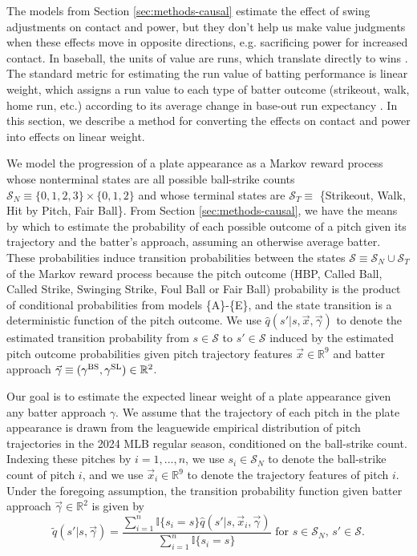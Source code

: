 \documentclass{article}
\begin{document}
      The models from Section \ref{sec:methods-causal} estimate the effect of swing adjustments on contact and power, but they don't help us make value judgments when these effects move in opposite directions, e.g. sacrificing power for increased contact. In baseball, the units of value are runs, which translate directly to wins \citep{james_bill_1983}. The standard metric for estimating the run value of batting performance is linear weight, which assigns a run value to each type of batter outcome (strikeout, walk, home run, etc.) according to its average change in base-out run expectancy \citep{thorn_hidden_1984}. In this section, we describe a method for converting the effects on contact and power into effects on linear weight.

      We model the progression of a plate appearance as a Markov reward process whose nonterminal states are all possible ball-strike counts $\mathcal{S}_N \equiv \{0, 1, 2, 3\} \times \{0, 1, 2\}$ and whose terminal states are $\mathcal{S}_T \equiv$ \{Strikeout, Walk, Hit by Pitch, Fair Ball\}. From Section \ref{sec:methods-causal}, we have the means by which to estimate the probability of each possible outcome of a pitch given its trajectory and the batter's approach, assuming an otherwise average batter. These probabilities induce transition probabilities between the states $\mathcal{S} \equiv \mathcal{S}_N \cup \mathcal{S}_T$ of the Markov reward process because the pitch outcome (HBP, Called Ball, Called Strike, Swinging Strike, Foul Ball or Fair Ball) probability is the product of conditional probabilities from models \{A\}-\{E\}, and the state transition is a deterministic function of the pitch outcome. We use $\hat q(s' | s, \vec x, \vec \gamma)$ to denote the estimated transition probability from $s \in \mathcal{S}$ to $s' \in \mathcal{S}$ induced by the estimated pitch outcome probabilities given pitch trajectory features $\vec x \in \mathbb{R}^9$ and batter approach $\vec\gamma \equiv (\gamma^{\mbox{\scriptsize BS}}, \gamma^{\mbox{\scriptsize SL}}) \in \mathbb{R}^2$.

      Our goal is to estimate the expected linear weight of a plate appearance given any batter approach $\gamma$. We assume that the trajectory of each pitch in the plate appearance is drawn from the leaguewide empirical distribution of pitch trajectories in the 2024 MLB regular season, conditioned on the ball-strike count. Indexing these pitches by $i = 1, ..., n$, we use $s_i \in \mathcal{S}_N$ to denote the ball-strike count of pitch $i$, and we use $\vec x_i \in \mathbb{R}^9$ to denote the trajectory features of pitch $i$. Under the foregoing assumption, the transition probability function given batter approach $\vec\gamma \in \mathbb{R}^2$ is given by
      \begin{equation*}
        \tilde q(s' | s, \vec\gamma) = \frac{
          \sum_{i = 1}^n \mathbb{I}\{s_i = s\} \hat q(s' | s, \vec x_i, \vec\gamma)
        }{
          \sum_{i = 1}^n \mathbb{I}\{s_i = s\}
        } \mbox{ for }s \in \mathcal{S}_N,\, s' \in \mathcal{S}.
      \end{equation*}
\end{document}
